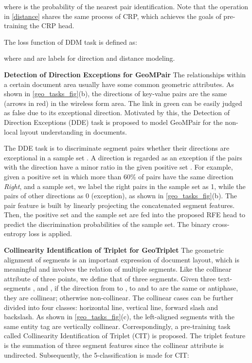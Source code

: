 \documentclass[10pt,twocolumn,letterpaper]{article}
\begin{document}
where  is the probability of the nearest pair identification.
Note that the operation in \cref{distance} shares the same process of CRP, which achieves the goals of pre-training the CRP head.

The loss function  of DDM task is defined as:
\vspace{-2mm}

where  and  are labels for direction and distance modeling.



\noindent\textbf{Detection of Direction Exceptions for GeoMPair} The relationships within a certain document area usually have some common geometric attributes. As shown in \cref{geo_tasks_fig}(b), the directions of key-value pairs are the same (arrows in red) in the wireless form area. The link in green can be easily judged as false due to its exceptional direction.
Motivated by this, the Detection of Direction Exceptions (DDE) task is proposed to model GeoMPair for the non-local layout understanding in documents.

The DDE task is to discriminate segment pairs whether their directions are exceptional in a \textsf{sample set} .
A direction is regarded as an exception if the pairs with the direction have a minor ratio in the given \textsf{positive set} .
For example, given a positive set in which more than 60\% of pairs have the same direction \textit{Right}, and a sample set, we label the right pairs in the sample set as 1, while the pairs of other directions as 0 (exception), as shown in \cref{geo_tasks_fig}(b).
The pair feature  is built by linearly projecting the concatenated segment features.
Then, the positive set and the sample set are fed into the proposed RFE head to predict the discrimination probabilities of the sample set. The binary cross-entropy loss is applied.
\vspace{-2mm}





\noindent\textbf{Collinearity Identification of Triplet for GeoTriplet} 
The geometric alignment of segments is an important expression of document layout, which is meaningful and involves the relation of multiple segments. 
Like the collinear attribute of three points, we define that of three segments. 
Given three text-segments ,  and , if the direction from  to ,  to  and  to  are the same or antiphase, they are collinear; otherwise non-collinear. The collinear cases can be further divided into four classes: horizontal line, vertical line, forward slash and backslash.
As shown in \cref{geo_tasks_fig}(c), the left-aligned segments with the same entity tag are vertically collinear.
Correspondingly, a pre-training task called Collinearity Identification of Triplet (CIT) is proposed.
The triplet feature is the summation of three segment features since the collinear attribute is undirected. Subsequently, the 5-classification is made for CIT:
\vspace{-2mm}
\end{document}
